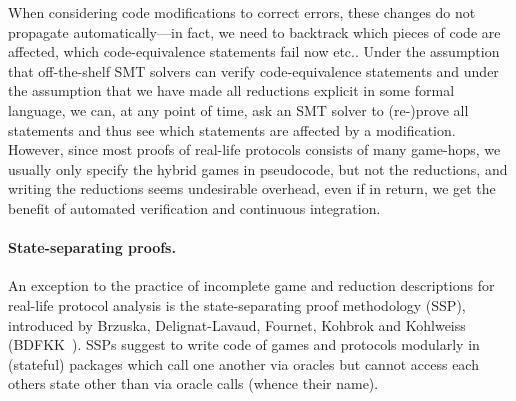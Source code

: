 When considering code modifications to correct errors, these changes do not
propagate automatically---in fact, we need to backtrack which pieces
of code are affected, which code-equivalence statements fail now etc..
Under the assumption that off-the-shelf SMT solvers can verify
code-equivalence statements and under the assumption that we have
made all reductions explicit in some formal language, we can, at 
any point of time, ask an SMT solver to (re-)prove all statements and thus see which
statements are affected by a modification. However, since most proofs
of real-life protocols consists of many game-hops, we usually only
specify the hybrid games in pseudocode, but not the reductions, and
writing the reductions seems undesirable overhead, even if in return, we
get the benefit of automated verification and continuous integration.



\paragraph{State-separating proofs.}
An exception to the practice of incomplete game and reduction descriptions for
real-life protocol analysis is the state-separating proof methodology (SSP),
introduced by Brzuska, Delignat-Lavaud, Fournet, Kohbrok and Kohlweiss (BDFKK~\cite{X}). SSPs suggest to write code of games and protocols modularly in (stateful) packages which call one another via oracles but cannot access each others state other than
via oracle calls (whence their name). 

